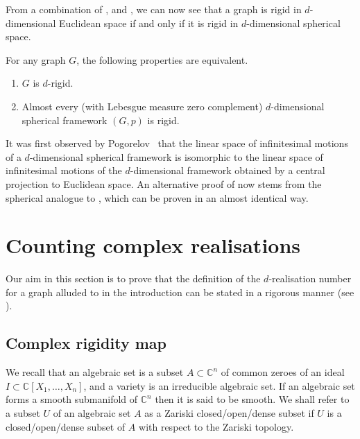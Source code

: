 \documentclass[ALCO]{cedram}
\begin{document}
From a combination of ,  and ,
we can now see that a graph is rigid in $d$-dimensional Euclidean space if and only if it is rigid in $d$-dimensional spherical space.

\begin{theorem}\label{t:sphereclassic}
	For any graph $G$, the following properties are equivalent.
	\begin{enumerate}
		\item $G$ is $d$-rigid.
		\item Almost every (\ie with Lebesgue measure zero complement) $d$-dimensional spherical framework $(G,p)$ is rigid.
	\end{enumerate}
\end{theorem}

\begin{remark}
	It was first observed by Pogorelov~\cite[Chapter V]{Pog73} that the linear space of infinitesimal motions of a $d$-dimensional spherical framework is isomorphic to the linear space of infinitesimal motions of the $d$-dimensional framework obtained by a central projection to Euclidean space.
	An alternative proof of  now stems from the spherical analogue to ,
	which can be proven in an almost identical way.
\end{remark}


\section{Counting complex realisations}\label{sec:count}

Our aim in this section is to prove that the definition of the $d$-realisation number for a graph alluded to in the introduction can be stated in a rigorous manner (see ).

\subsection{Complex rigidity map}

We recall that an algebraic set is a subset $A \subset \mathbb{C}^n$ of common zeroes of an ideal $I \subset \mathbb{C}[X_1,\ldots,X_n]$,
and a variety is an irreducible algebraic set.
If an algebraic set forms a smooth submanifold of $\mathbb{C}^n$ then it is said to be smooth.
We shall refer to a subset $U$ of an algebraic set $A$ as a Zariski closed/open/dense subset if $U$ is a closed/open/dense subset of $A$ with respect to the Zariski topology.
\end{document}
